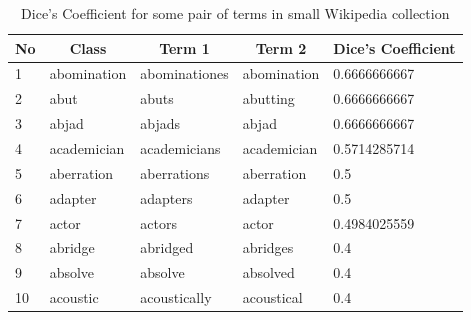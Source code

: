 \documentclass[letterpaper,11pt]{article}
\begin{document}
\begin{table}[H]
\centering
\begin{tabular}{|l|l|l|l|l|}
\hline
No & \multicolumn{1}{c|}{\textbf{Class}} & \multicolumn{1}{c|}{\textbf{Term 1}} & \multicolumn{1}{c|}{\textbf{Term 2}} & \multicolumn{1}{c|}{\textbf{Dice's Coefficient}} \\ \hline
1  & abomination                         & abominationes                        & abomination                          & 0.6666666667                                     \\ \hline
2  & abut                                & abuts                                & abutting                             & 0.6666666667                                     \\ \hline
3  & abjad                               & abjads                               & abjad                                & 0.6666666667                                     \\ \hline
4  & academician                         & academicians                         & academician                          & 0.5714285714                                     \\ \hline
5  & aberration                          & aberrations                          & aberration                           & 0.5                                              \\ \hline
6  & adapter                             & adapters                             & adapter                              & 0.5                                              \\ \hline
7  & actor                               & actors                               & actor                                & 0.4984025559                                     \\ \hline
8  & abridge                             & abridged                             & abridges                             & 0.4                                              \\ \hline
9  & absolve                             & absolve                              & absolved                             & 0.4                                              \\ \hline
10 & acoustic                            & acoustically                         & acoustical                           & 0.4                                              \\ \hline
\end{tabular}
\caption{Dice's Coefficient for some pair of terms in small Wikipedia collection}
\label{tab:dice}
\end{table}
\end{document}
